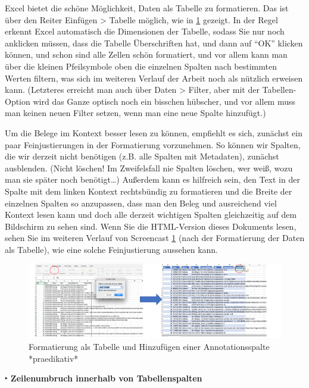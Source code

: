 \documentclass[]{article}
\begin{document}
Excel bietet die schöne Möglichkeit, Daten als Tabelle zu formatieren.
Das ist über den Reiter Einfügen \textgreater{} Tabelle möglich, wie in
\ref{fig:excelastable} gezeigt. In der Regel erkennt Excel automatisch
die Dimensionen der Tabelle, sodass Sie nur noch anklicken müssen, dass
die Tabelle Überschriften hat, und dann auf \enquote{OK} klicken können,
und schon sind alle Zellen schön formatiert, und vor allem kann man über
die kleinen Pfeilsymbole oben die einzelnen Spalten nach bestimmten
Werten filtern, was sich im weiteren Verlauf der Arbeit noch als
nützlich erweisen kann. (Letzteres erreicht man auch über Daten
\textgreater{} Filter, aber mit der Tabellen-Option wird das Ganze
optisch noch ein bisschen hübscher, und vor allem muss man keinen neuen
Filter setzen, wenn man eine neue Spalte hinzufügt.)

Um die Belege im Kontext besser lesen zu können, empfiehlt es sich,
zunächst ein paar Feinjustierungen in der Formatierung vorzunehmen. So
können wir Spalten, die wir derzeit nicht benötigen (z.B. alle Spalten
mit Metadaten), zunächst ausblenden. (Nicht löschen! Im Zweifelsfall nie
Spalten löschen, wer weiß, wozu man sie später noch benötigt\ldots{})
Außerdem kann es hilfreich sein, den Text in der Spalte mit dem linken
Kontext rechtsbündig zu formatieren und die Breite der einzelnen Spalten
so anzupassen, dass man den Beleg und ausreichend viel Kontext lesen
kann und doch alle derzeit wichtigen Spalten gleichzeitig auf dem
Bildschirm zu sehen sind. Wenn Sie die HTML-Version dieses Dokuments
lesen, sehen Sie im weiteren Verlauf von Screencast
\ref{fig:excelastable} (nach der Formatierung der Daten als Tabelle),
wie eine solche Feinjustierung aussehen kann.

\begin{figure}
\includegraphics[width=6.66in]{docs/fig/excelastable01} \caption{Formatierung als Tabelle und Hinzufügen einer Annotationsspalte *praedikativ*}\label{fig:excelastable}
\end{figure}

 ‣ \textbf{Zeilenumbruch innerhalb von Tabellenspalten}
\end{document}
